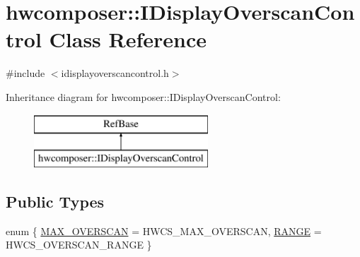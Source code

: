 \hypertarget{classhwcomposer_1_1IDisplayOverscanControl}{}\section{hwcomposer\+:\+:I\+Display\+Overscan\+Control Class Reference}
\label{classhwcomposer_1_1IDisplayOverscanControl}


{\ttfamily \#include $<$idisplayoverscancontrol.\+h$>$}

Inheritance diagram for hwcomposer\+:\+:I\+Display\+Overscan\+Control\+:\begin{figure}[H]
\begin{center}
\leavevmode
\includegraphics[height=2.000000cm]{classhwcomposer_1_1IDisplayOverscanControl}
\end{center}
\end{figure}
\subsection*{Public Types}
\begin{DoxyCompactItemize}
\item 
enum \{ \mbox{\hyperlink{classhwcomposer_1_1IDisplayOverscanControl_a864e169f204e86500afef542b1486b60a03e2374ea34aba79a543224df3bd7f74}{M\+A\+X\+\_\+\+O\+V\+E\+R\+S\+C\+AN}} = H\+W\+C\+S\+\_\+\+M\+A\+X\+\_\+\+O\+V\+E\+R\+S\+C\+AN, 
\mbox{\hyperlink{classhwcomposer_1_1IDisplayOverscanControl_a864e169f204e86500afef542b1486b60a67d0c9f5032c49e22f12aac2cc839c02}{R\+A\+N\+GE}} = H\+W\+C\+S\+\_\+\+O\+V\+E\+R\+S\+C\+A\+N\+\_\+\+R\+A\+N\+GE
 \}
\end{DoxyCompactItemize}
